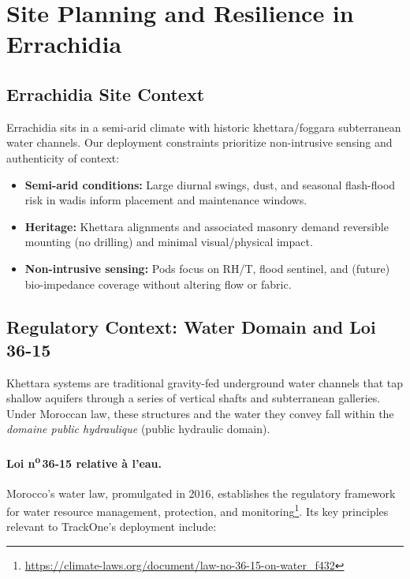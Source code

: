 \section{Site Planning and Resilience in Errachidia}
\label{sec:site_planning}

\subsection{Errachidia Site Context}\label{subsec:errachidia-site-context}
Errachidia sits in a semi-arid climate with historic khettara/foggara subterranean water channels.
Our deployment constraints prioritize non-intrusive sensing and authenticity of context:
\begin{itemize}[nosep]
  \item \textbf{Semi-arid conditions:} Large diurnal swings, dust, and seasonal flash-flood risk in wadis inform placement and maintenance windows.
  \item \textbf{Heritage:} Khettara alignments and associated masonry demand reversible mounting (no drilling) and minimal visual/physical impact.
  \item \textbf{Non-intrusive sensing:} Pods focus on RH/T, flood sentinel, and (future) bio-impedance coverage without altering flow or fabric.
\end{itemize}

\subsection{Regulatory Context: Water Domain and Loi 36-15}
\label{subsec:water-law}

Khettara systems are traditional gravity-fed underground water channels that tap shallow
aquifers through a series of vertical shafts and subterranean galleries.
Under Moroccan law, these structures and the water they convey fall within the
\emph{domaine public hydraulique} (public hydraulic domain).

\paragraph{Loi n\textsuperscript{o}\,36-15 relative à l'eau.}
Morocco's water law, promulgated in 2016, establishes the regulatory framework for
water resource management, protection, and monitoring\footnote{\url{https://climate-laws.org/document/law-no-36-15-on-water_f432}}.
Its key principles relevant to TrackOne's deployment include:

